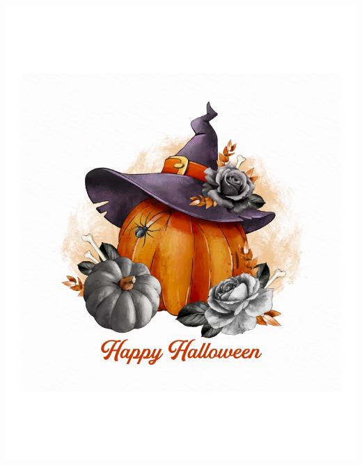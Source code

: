 \documentclass[10pt,twoside,slovak,a4paperr]{coursepaper}
\begin{document}
\graphicspath{{./obrazky/}}
\includegraphics[scale=0.5]{tekvica.pdf}
\centering
\end{document}
